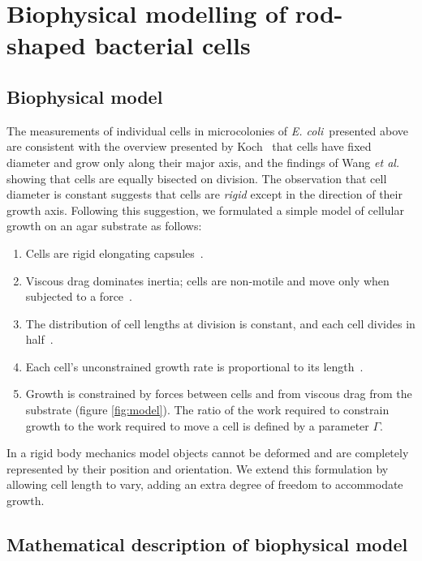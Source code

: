 \documentclass{report}
\newcommand{\ecoli}{\textit{E. coli}}
\newcommand{\etal}{\textit{et al.}}
\begin{document}
 

\chapter{Biophysical modelling of rod-shaped bacterial cells}
\section{Biophysical model}
The measurements of individual cells in microcolonies of \ecoli\
presented above are consistent with the overview presented by
Koch~\cite{Koch:1995} that cells have fixed diameter and grow only along their
major axis, and the findings of Wang \etal~\cite{Wang:2010} showing that cells
are equally bisected on division.  The observation that cell diameter is
constant suggests that cells are \textit{rigid} except in the direction of
their growth axis. Following this suggestion, we formulated a simple model of
cellular growth on an agar substrate as follows: 
\begin{enumerate} 
\item Cells are rigid elongating capsules~\cite{Koch:1995}.  
\item Viscous drag dominates inertia; cells are non-motile and move only when
subjected to a force~\cite{Purcell:1977}.  
\item The distribution of cell lengths at division is constant, and each cell
divides in half~\cite{Wang:2010,Koch:1995}.    
\item Each cell's unconstrained growth rate is proportional to its
length~\cite{Wang:2010}.  
\item Growth is constrained by forces between cells and from viscous drag from
the substrate (figure \ref{fig:model}).  The ratio of the work required to
constrain growth to the work required to move a cell is defined by a parameter
$\Gamma$.  
\end{enumerate}
In a rigid body mechanics model objects cannot be deformed and are completely
represented by their position and orientation. We extend this formulation by
allowing cell length to vary, adding an extra degree of freedom to accommodate
growth.

\section{Mathematical description of biophysical model}
\end{document}
